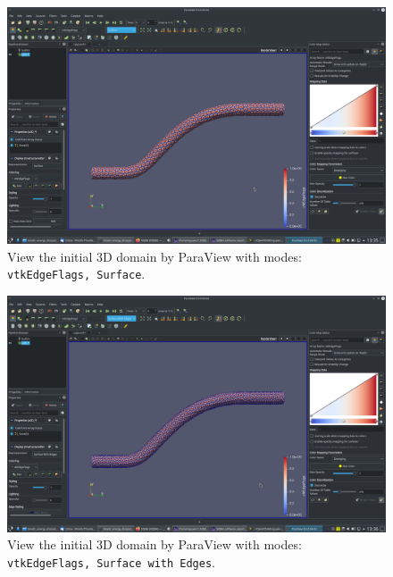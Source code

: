 \documentclass[onsided]{book}
\numberwithin{equation}{section}
\begin{document}
\begin{enumerate}
\begin{enumerate}
        \begin{figure}[H]
            \centering
            \includegraphics[height=0.44\textheight]{initial_domain_3D_vtkEdgeFlags_Surface}
            \caption{View the initial 3D domain by ParaView with modes: \texttt{vtkEdgeFlags, Surface}.}
        \end{figure}
        
        \begin{figure}[H]
            \centering
            \includegraphics[height=0.44\textheight]{initial_domain_3D_vtkEdgeFlags_Surface_with_Edges}
            \caption{View the initial 3D domain by ParaView with modes: \texttt{vtkEdgeFlags, Surface with Edges}.}
        \end{figure}
    

\end{enumerate}
\end{enumerate}
\end{document}
